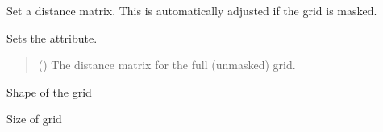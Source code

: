 \documentclass[letterpaper,10pt,english]{sphinxmanual}
\begin{document}
\begin{fulllineitems}
\begin{fulllineitems}
\label{\detokenize{grid:glomar_gridding.grid.Grid.set_distance_matrix}}
\pysigstartsignatures
\pysiglinewithargsret
{}
{}
{}
\pysigstopsignatures
\sphinxAtStartPar
Set a distance matrix. This is automatically adjusted if the grid is
masked.

\sphinxAtStartPar
Sets the  attribute.
\begin{quote}\begin{description}
\sphinxAtStartPar
{} (\sphinxstyleliteralemphasis{\sphinxupquote{ | }}) \textendash{} The distance matrix for the full (unmasked) grid.

\sphinxAtStartPar
{}

\end{description}\end{quote}

\end{fulllineitems}


\begin{fulllineitems}
\label{\detokenize{grid:glomar_gridding.grid.Grid.shape}}
\pysigstartsignatures
\pysigline
{}
\pysigstopsignatures
\sphinxAtStartPar
Shape of the grid

\end{fulllineitems}


\begin{fulllineitems}
\label{\detokenize{grid:glomar_gridding.grid.Grid.size}}
\pysigstartsignatures
\pysigline
{}
\pysigstopsignatures
\sphinxAtStartPar
Size of grid

\end{fulllineitems}


\end{fulllineitems}
\end{document}
